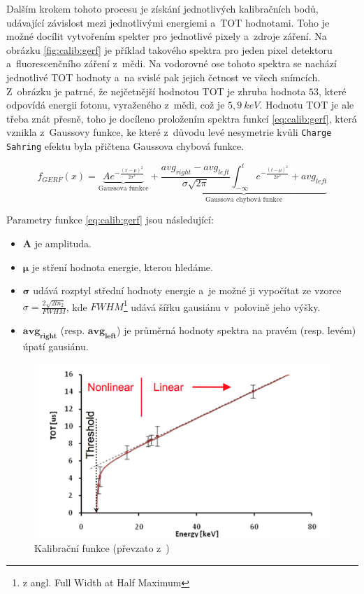Dalším krokem tohoto procesu je získání jednotlivých kalibračních bodů, udávající závislost mezi jednotlivými energiemi a~TOT hodnotami. Toho je možné docílit vytvořením spekter pro jednotlivé pixely a~zdroje záření. Na obrázku \ref{fig:calib:gerf} je příklad takového spektra pro jeden pixel detektoru a~fluorescenčního záření z~mědi. Na vodorovné ose tohoto spektra se nachází jednotlivé TOT hodnoty a~na svislé pak jejich četnost ve všech snímcích. Z~obrázku je patrné, že nejčetnější hodnotou TOT je zhruba hodnota $53$, které odpovídá energii fotonu, vyraženého z~mědi, což je $5,9~keV$. Hodnotu TOT je ale třeba znát přesně, toho je docíleno proložením spektra funkcí \ref{eq:calib:gerf}, která vznikla z~Gaussovy funkce, ke které z~důvodu levé nesymetrie kvůli \texttt{Charge Sahring} efektu byla přičtena Gaussova chybová funkce. 

\begin{equation}\label{eq:calib:gerf}
	f_{GERF}(x) = \underbrace{Ae^{ -\frac{(x-\mu)^2}{2\sigma^2} }}_{\text{Gaussova funkce}} +
	\underbrace{ \frac{avg_{right} - avg_{left}}{\sigma\sqrt{2\pi}} \int_{-\infty}^t e^{ -\frac{(t-\mu)^2}{2\sigma^2} } + avg_{left}}_{\text{Gaussova chybová funkce}}
\end{equation}

Parametry funkce \ref{eq:calib:gerf} jsou následující:
\begin{itemize}
	\item $\mathbf{A}$ je amplituda.
	\item $\mathbf{\mu}$ je stření hodnota energie, kterou hledáme.
	\item $\mathbf{\sigma}$ udává rozptyl střední hodnoty energie a~je možné ji vypočítat ze vzorce 
		$\sigma = \frac{2\sqrt{2ln_2}}{FWHM}$, kde $FWHM$\footnote{z angl. Full Width at Half Maximum} udává šířku gausiánu v~polovině jeho výšky.
	\item $\mathbf{avg_{right}}$ (resp. $\mathbf{avg_{left}}$) je průměrná hodnoty spektra na pravém (resp. levém) úpatí gausiánu.
\end{itemize}
 
\begin{figure}[th]
	\begin{center}
		\includegraphics[width=13cm]{figures/calib_function.png}
		\caption{Kalibrační funkce (převzato z~\cite{Jakubek2011S262})}
		\label{fig:calib:calib_function}
	\end{center}
\end{figure}

